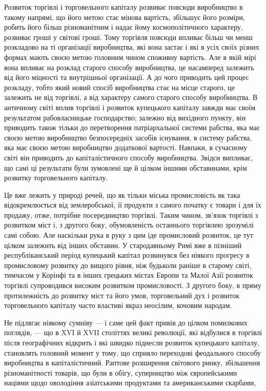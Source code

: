 Розвиток торгівлі і торговельного капіталу розвиває повсюди
виробництво в такому напрямі, що його метою стає мінова вартість,
збільшує його розміри, робить його більш різноманітним і
надає йому космополітичного характеру, розвиває гроші у світові
гроші. Тому торгівля повсюди впливає більш чи менш розкладово
на ті організації виробництва, які вона застає і які в усіх
своїх різних формах мають своєю метою головним чином споживну
вартість. Але в якій мірі вона впливає на розклад старого
способу виробництва, це насамперед залежить від його
міцності та внутрішньої організації. А до чого приводить цей
процес розкладу, тобто який новий спосіб виробництва стає на
місце старого, це залежить не від торгівлі, а від характеру
самого старого способу виробництва. В античному світі вплив
торгівлі і розвиток купецького капіталу завжди має своїм результатом
рабовласницьке господарство; залежно від вихідного
пункту, він приводить також тільки до перетворення патріархальної
системи рабства, яка має своєю метою виробництво безпосередніх
засобів існування, в систему рабства, яка має своєю
метою виробництво додаткової вартості. Навпаки, в сучасному
світі він приводить до капіталістичного способу виробництва.
Звідси випливає, що самі ці результати були зумовлені ще
й цілком іншими обставинами, крім розвитку торговельного капіталу.

Це вже лежить у природі речей, що як тільки міська промисловість
як така відокремлюється від землеробської, її продукти
з самого початку є товари і для їх продажу, отже, потрібне
посередництво торгівлі. Таким чином, зв’язок торгівлі
з розвитком міст і, з другого боку, обумовленість останнього
торгівлею зрозумілі самі собою. Але наскільки рука в руку
з цим іде промисловий розвиток, це тут цілком залежить від
інших обставин. У стародавньому Римі вже в пізніший республіканський
період купецький капітал розвинувся без ніякого
прогресу в промисловому розвитку до вищого рівня, ніж будьколи
раніше в старому світі, тимчасом у Корінфі та в інших
грецьких містах Европи та Малої Азії розвиток торгівлі супроводився
високим розвитком промисловості. З другого боку,
в пряму протилежність до розвитку міст та його умов, торговельний
дух і розвиток торговельного капіталу часто властиві
якраз неосілим, кочовим народам.

Не підлягає ніякому сумніву — і саме цей факт привів до
цілком помилкових поглядів, — що в XVI й XVII століттях великі
революції, які відбулися в торгівлі після географічних відкрить
і які швидко піднесли розвиток купецького капіталу,
становлять головний момент у тому, що сприяло переходові
феодального способу виробництва в капіталістичний. Раптове
розширення світового ринку, збільшення різноманітності товарів,
що були в обігу, суперництво між європейськими націями щодо
оволодіння азіатськими продуктами та американськими скарбами,
\parbreak{}  %
